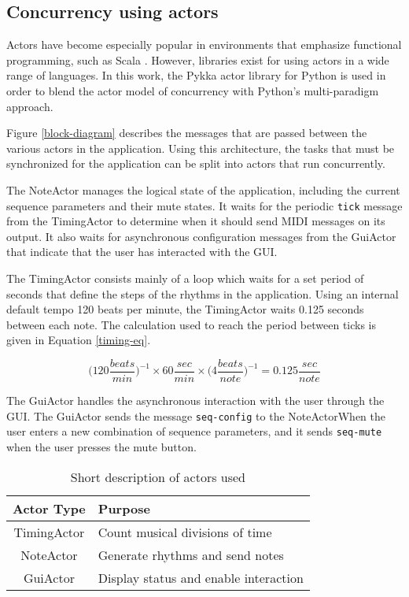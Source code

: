 \documentclass{sig-alternate-05-2015}
\begin{document}
\subsection{Concurrency using actors}
Actors have become especially popular in environments that emphasize functional programming, such as Scala \cite{karmani2009actor}. However, libraries exist for using actors in a wide range of languages. In this work, the Pykka actor library for Python is used in order to blend the actor model of concurrency with Python's multi-paradigm approach.

Figure \ref{block-diagram} describes the messages that are passed between the various actors in the application. Using this architecture, the tasks that must be synchronized for the application can be split into actors that run concurrently. 

The NoteActor manages the logical state of the application, including the current sequence parameters and their mute states. It waits for the periodic \texttt{tick} message from the TimingActor to determine when it should send MIDI messages on its output. It also waits for asynchronous configuration messages from the GuiActor that indicate that the user has interacted with the GUI. 

The TimingActor consists mainly of a loop which waits for a set period of seconds that define the steps of the rhythms in the application. Using an internal default tempo 120 beats per minute, the TimingActor waits 0.125 seconds between each note. The calculation used to reach the period between ticks is given in Equation \ref{timing-eq}.

\begin{equation}
\bigg(120 \frac{beats}{min} \bigg)^{-1} \times 60 \frac{sec}{min} \times \bigg(4 \frac{beats}{note} \bigg) ^{-1} = 0.125 \frac{sec}{note}
\label{timing-eq}
\end{equation}

The GuiActor handles the asynchronous interaction with the user through the GUI. The GuiActor sends the message \texttt{seq-config} to the NoteActorWhen the user enters a new combination of sequence parameters, and it sends \texttt{seq-mute} when the user presses the mute button.

\begin{table}
\centering
\caption{Short description of actors used}
\begin{tabular}{|c|l|} \hline
\textbf{Actor Type} & \textbf{Purpose}\\ \hline \hline
TimingActor & Count musical divisions of time\\ \hline
NoteActor & Generate rhythms and send notes\\ \hline
GuiActor & Display status and enable interaction\\ \hline
\end{tabular}
\end{table}
\end{document}
